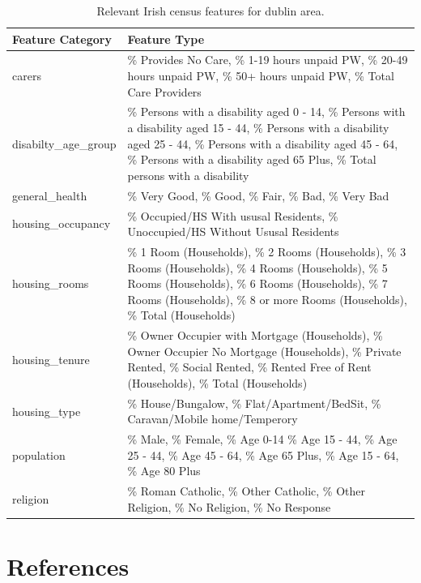 \documentclass[]{elsarticle} %
\begin{document}
\begin{table}[t]

\caption{\label{tab:all-census-features}Relevant Irish census features for dublin area.}
\centering
\fontsize{8}{10}\selectfont
\begin{tabular}{l>{\raggedright\arraybackslash}p{3in}}
\toprule
Feature Category & Feature Type\\
\midrule
carers & \% Provides No Care,                          
 \% 1-19 hours unpaid PW,                     
 \% 20-49 hours unpaid PW,                     
 \% 50+ hours unpaid PW,                      
 \% Total Care Providers\\
disabilty\_age\_group & \% Persons with a disability aged 0 - 14,      
 \% Persons with a disability aged 15 - 44,    
 \% Persons with a disability aged 25 - 44,   
 \% Persons with a disability aged 45 - 64,    
 \% Persons with a disability aged 65 Plus,   
 \% Total persons with a disability\\
general\_health & \% Very Good,                                
 \% Good,                                     
 \% Fair,                                     
 \% Bad,                                       
 \% Very Bad\\
housing\_occupancy & \% Occupied/HS With ususal Residents,         
 \%  Unoccupied/HS Without Ususal Residents\\
housing\_rooms & \% 1 Room (Households),                      
 \% 2 Rooms (Households),                      
 \% 3 Rooms (Households),                     
 \% 4 Rooms (Households),                      
 \% 5 Rooms (Households),                     
 \% 6 Rooms (Households),                      
 \% 7 Rooms (Households),                     
 \% 8 or more Rooms (Households),              
 \% Total (Households)\\
housing\_tenure & \% Owner Occupier with Mortgage (Households),
 \% Owner Occupier No Mortgage (Households),   
 \% Private Rented,                           
 \% Social Rented,                             
 \% Rented Free of Rent (Households),        
 \% Total (Households)\\
housing\_type & \% House/Bungalow,                           
 \% Flat/Apartment/BedSit,                     
 \% Caravan/Mobile home/Temperory\\
population & \% Male,
 \% Female,
 \% Age 0-14
 \% Age 15 - 44,    
 \% Age 25 - 44,   
 \% Age 45 - 64,    
 \% Age 65 Plus,
 \% Age 15 - 64, 
 \% Age 80 Plus\\
religion & \% Roman Catholic,
\% Other Catholic,
\% Other Religion,
\% No Religion,
\% No Response\\
\bottomrule
\end{tabular}
\end{table}

\section*{References}\label{references}
\end{document}
